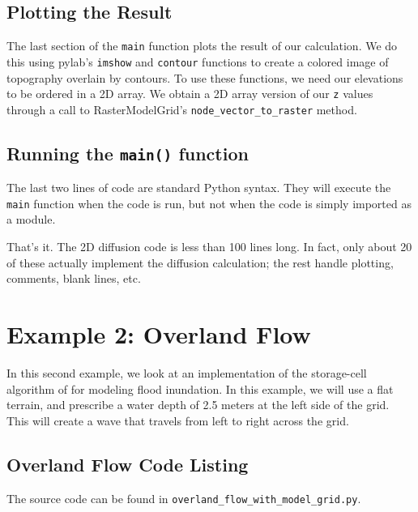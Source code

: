 \documentclass[12pt]{article}
\newcommand{\code}[1]{{\tt #1}}
\begin{document}
\subsection{Plotting the Result}



The last section of the \code{main} function plots the result of our calculation. We do this using pylab's \code{imshow} and \code{contour} functions to create a colored image of topography overlain by contours. To use these functions, we need our elevations to be ordered in a 2D array. We obtain a 2D array version of our \code{z} values through a call to RasterModelGrid's \code{node\_vector\_to\_raster} method.

\subsection{Running the \code{main()} function}



The last two lines of code are standard Python syntax. They will execute the \code{main} function when the code is run, but not when the code is simply imported as a module.

That's it. The 2D diffusion code is less than 100 lines long. In fact, only about 20 of these actually implement the diffusion calculation; the rest handle plotting, comments, blank lines, etc.


\section{Example 2: Overland Flow}

In this second example, we look at an implementation of the storage-cell algorithm of \citet{bates2010simple} for modeling flood inundation. In this example, we will use a flat terrain, and prescribe a water depth of 2.5 meters at the left side of the grid. This will create a wave that travels from left to right across the grid.

\subsection{Overland Flow Code Listing}

The source code can be found in \code{overland\_flow\_with\_model\_grid.py}.
\end{document}
